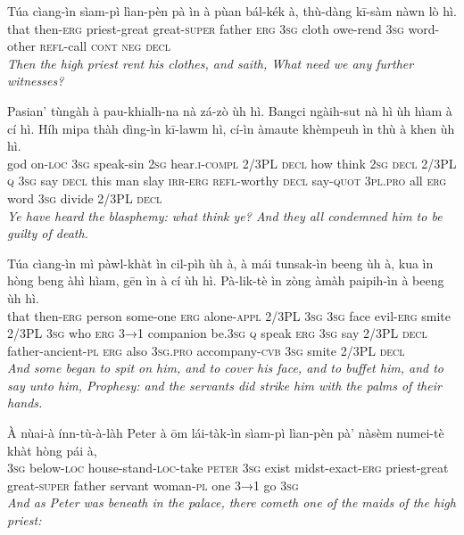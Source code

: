 \documentclass[11pt,a4paper]{article}
\begin{document}
\begin{exe}
\gll Túa cìang-ìn sìam-pì lìan-pèn pà ìn à pùan bál-kék à, thù-dàng kī-sàm nàwn lò hì. \\
     that then-\textsc{erg} priest-great great-\textsc{super} father \textsc{erg} \textsc{3sg} cloth owe-rend \textsc{3sg} word-other \textsc{refl}-call \textsc{cont} \textsc{neg} \textsc{decl} \\
\glt \textcolor{kjvcolor}{\textit{Then the high priest rent his clothes, and saith, What need we any further witnesses?}}

\gll Pasian' tùngàh à pau-khialh-na nà zá-zò ùh hì. Bangci ngàih-sut nà hì ùh hìam à cí hì. Híh mipa thàh dìng-ìn kī-lawm hì, cí-ìn àmaute khèmpeuh ìn thù à khen ùh hì. \\
     god on-\textsc{loc} \textsc{3sg} speak-sin \textsc{2sg} hear.\textsc{i}-\textsc{compl} 2/3PL \textsc{decl} how think \textsc{2sg} \textsc{decl} 2/3PL \textsc{q} \textsc{3sg} say \textsc{decl} this man slay \textsc{irr}-\textsc{erg} \textsc{refl}-worthy \textsc{decl} say-\textsc{quot} \textsc{3pl}.\textsc{pro} all \textsc{erg} word \textsc{3sg} divide 2/3PL \textsc{decl} \\
\glt \textcolor{kjvcolor}{\textit{Ye have heard the blasphemy: what think ye? And they all condemned him to be guilty of death.}}

\gll Túa cìang-ìn mì pàwl-khàt ìn cil-pìh ùh à, à mái tunsak-ìn beeng ùh à, kua ìn hòng beng àhì hìam, gēn ìn à cí ùh hì. Pà-lik-tè ìn zòng àmàh paipih-ìn à beeng ùh hì. \\
     that then-\textsc{erg} person some-one \textsc{erg} alone-\textsc{appl} 2/3PL \textsc{3sg} \textsc{3sg} face evil-\textsc{erg} smite 2/3PL \textsc{3sg} who \textsc{erg} \textsc{3→1} companion be.\textsc{3sg} \textsc{q} speak \textsc{erg} \textsc{3sg} say 2/3PL \textsc{decl} father-ancient-\textsc{pl} \textsc{erg} also \textsc{3sg}.\textsc{pro} accompany-\textsc{cvb} \textsc{3sg} smite 2/3PL \textsc{decl} \\
\glt \textcolor{kjvcolor}{\textit{And some began to spit on him, and to cover his face, and to buffet him, and to say unto him, Prophesy: and the servants did strike him with the palms of their hands.}}

\gll À nùai-à ínn-tù-à-làh Peter à ōm lái-tàk-ìn sìam-pì lìan-pèn pà' nàsèm numei-tè khàt hòng pái à, \\
     \textsc{3sg} below-\textsc{loc} house-stand-\textsc{loc}-take \textsc{peter} \textsc{3sg} exist midst-exact-\textsc{erg} priest-great great-\textsc{super} father servant woman-\textsc{pl} one \textsc{3→1} go \textsc{3sg} \\
\glt \textcolor{kjvcolor}{\textit{And as Peter was beneath in the palace, there cometh one of the maids of the high priest:}}


\end{exe}
\end{document}
